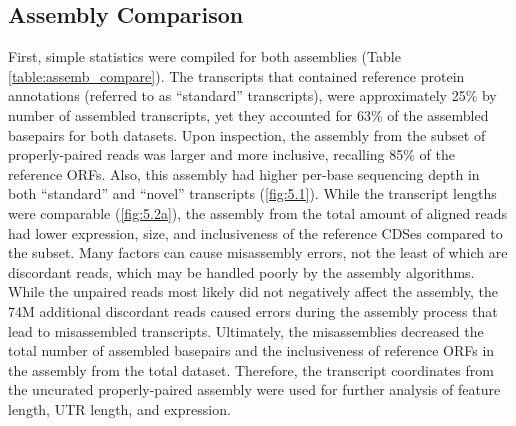 \subsection{Assembly Comparison}
First, simple statistics were compiled for both assemblies (Table \ref{table:assemb_compare}). The transcripts that contained reference protein annotations (referred to as ``standard'' transcripts), were approximately 25\% by number of assembled transcripts, yet they accounted for 63\% of the assembled basepairs for both datasets. Upon inspection, the assembly from the subset of properly-paired reads was larger and more inclusive, recalling 85\% of the reference ORFs. Also, this assembly had higher per-base sequencing depth in both ``standard'' and ``novel'' transcripts (\ref{fig:5.1}). While the transcript lengths were comparable (\ref{fig:5.2a}), the assembly from the total amount of aligned reads had lower expression, size, and inclusiveness of the reference CDSes compared to the subset. Many factors can cause misassembly errors, not the least of which are discordant reads, which may be handled poorly by the assembly algorithms. While the unpaired reads most likely did not negatively affect the assembly, the 74M additional discordant reads caused errors during the assembly process that lead to misassembled transcripts. Ultimately, the misassemblies decreased the total number of assembled basepairs and the inclusiveness of reference ORFs in the assembly from the total dataset. Therefore, the transcript coordinates from the uncurated properly-paired assembly were used for further analysis of feature length, UTR length, and expression.

